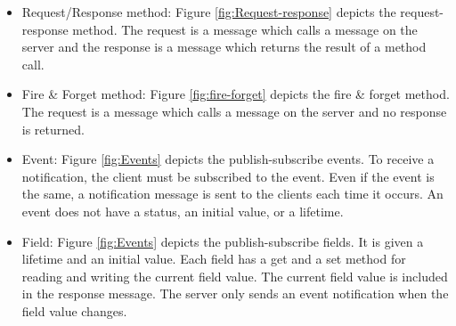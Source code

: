 \begin{itemize}
\item Request/Response method:
Figure \ref{fig:Request-response} depicts the request-response method. The request is a message which calls a message on the server and the response is a message which returns the result of a method call\cite{b1.3}.
\item Fire \& Forget method:
Figure \ref{fig:fire-forget} depicts the fire \& forget method. The request is a message which calls a message on the server and no response is returned\cite{b1.3}.
\item Event:
Figure \ref{fig:Events} depicts the publish-subscribe events. To receive a notification, the client must be subscribed to the event. Even if the event is the same, a notification message is sent to the clients each time it occurs. An event does not have a status, an initial value, or a lifetime\cite{b1.3}.
\item Field:
Figure \ref{fig:Events} depicts the publish-subscribe fields. It is given a lifetime and an initial value. Each field has a get and a set method for reading and writing the current field value. The current field value is included in the response message. The server only sends an event notification when the field value changes\cite{b1.3}.
\end{itemize}


